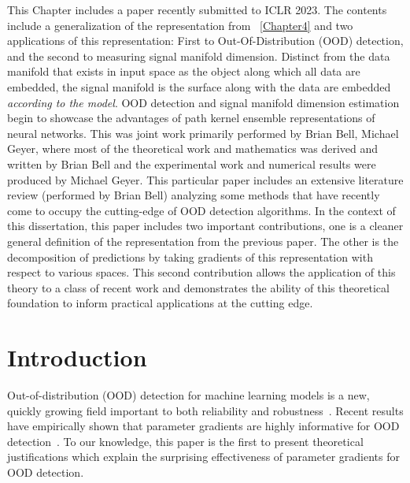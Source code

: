 This Chapter includes a paper recently submitted to ICLR 2023. The
contents include a generalization of the representation from
~\ref{Chapter4} and two applications of this representation: First to
Out-Of-Distribution (OOD) detection, and the second to measuring
signal manifold dimension. Distinct from the data manifold that exists in input space as the object along which all data are embedded, the signal manifold is the surface along with the data are embedded \emph{according to the model}. OOD detection and signal manifold dimension estimation begin to showcase the advantages of path kernel ensemble representations of neural
networks. This was joint work primarily performed by Brian Bell,
Michael Geyer, where most of the theoretical work and mathematics was
derived and written by Brian Bell and the experimental work and
numerical results were produced by Michael Geyer. This particular
paper includes an extensive literature review (performed by Brian Bell)
analyzing some methods that have recently come to occupy the
cutting-edge of OOD detection algorithms. In the context of this
dissertation, this paper includes two important contributions, one is
a cleaner general definition of the representation from the previous
paper. The other is the decomposition of predictions by taking
gradients of this representation with respect to various spaces. This
second contribution allows the application of this theory to a class
of recent work and demonstrates the ability of this theoretical
foundation to inform practical applications at the cutting edge. 




\section{Introduction}

Out-of-distribution (OOD) detection for machine learning models is a new, quickly growing field important to both reliability and robustness~\citep{hendrycks2019, biggio2014, hendrycks2017, desilva2023, yang2021, filos2020}.
Recent results have empirically shown that parameter gradients are highly informative for OOD detection~\citep{behpour2023, djurisic2023, huang2021}.
To our knowledge, this paper is the first to present theoretical justifications which explain the surprising effectiveness of parameter gradients for OOD detection.

